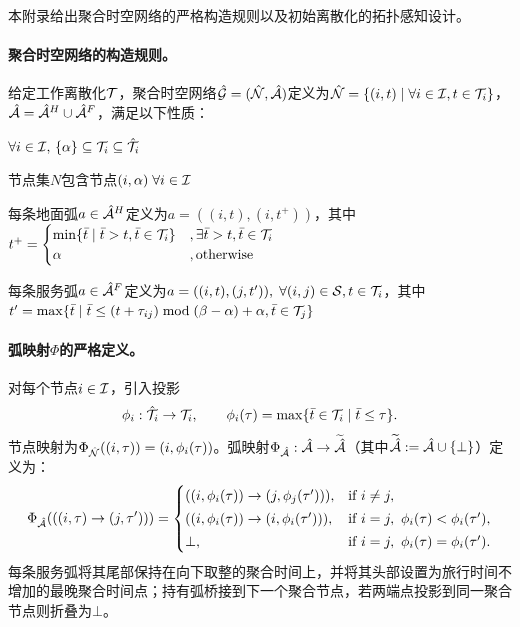 本附录给出聚合时空网络的严格构造规则以及初始离散化的拓扑感知设计。

\paragraph{聚合时空网络的构造规则。}
给定工作离散化$\mathcal{T}$，聚合时空网络$\hat{\mathcal{G}} = (\hat{\mathcal{N}}, \hat{\mathcal{A}})$定义为$\hat{\mathcal{N}} = \{(i,t)\mid \forall i\in\mathcal{I}, t\in\mathcal{T}_i\}$，$\hat{\mathcal{A}} = {\hat{\mathcal{A}}^H_{{}}} \cup {\hat{\mathcal{A}}^F_{{}}}$，满足以下性质：
\begin{property}
    $\forall i\in\mathcal{I},\,\{\alpha\}\subseteq\mathcal{T}_i\subseteq\hat{\mathcal{T}}_i$
\end{property}
\begin{property}[节点 $\nodeSet = \Phi_{\nodeSet}(\netFlat, \discretization)$]
    节点集$N$包含节点$(i,\alpha)\;\forall i\in\mathcal{I}$
\end{property}
\begin{property}[持有弧]
    \label{def:relax.holdingArc}
    每条地面弧$a\in{\hat{\mathcal{A}}^H_{{}}}$定义为$a=((i,t),(i,t^{+}))$，其中
    $t^{+}=\begin{cases}
            \min\{\bar{t}\mid\bar{t}>t,\bar{t}\in\mathcal{T}_i\} & ,\exists\bar{t}>t,\bar{t}\in\mathcal{T}_i\\
            \alpha & ,\text{otherwise}
    \end{cases}$
\end{property}
\begin{property}[服务弧]
    \label{def:relax.flightArc}
    每条服务弧$a\in{\hat{\mathcal{A}}^F_{{}}}$定义为$a=((i,t),(j,t^\prime)),\;\forall (i,j)\in\mathcal{S},t\in\mathcal{T}_i$，其中
    $t^\prime=\max\{\bar{t}\mid\bar{t}\leq(t+\tau_{ij})\;\text{mod}\;(\beta-\alpha)+\alpha,\bar{t}\in\mathcal{T}_j\}$
\end{property}

\paragraph{弧映射$\Phi$的严格定义。}
对每个节点$i\in\mathcal{I}$，引入投影
\[
    \phi_i:\hat{\mathcal{T}}_i\to\mathcal{T}_i,\qquad 
    \phi_i(\tau)=\max\{\bar{t}\in\mathcal{T}_i\mid \bar{t}\le \tau\}.
\]
节点映射为$\Phi_{\hat{\mathcal{N}}}((i,\tau))=(i,\phi_i(\tau))$。弧映射$\Phi_{\arcSet}:\full{\arcSet}\to\widetilde{\arcSet}$（其中$\widetilde{\hat{\mathcal{A}}}:=\hat{\mathcal{A}}\cup\{\bot\}$）定义为：
\begin{equation}
    \Phi_{\hat{\mathcal{A}}}(((i,\tau)\rightarrow(j,\tau'))) =
    \begin{cases}
        ((i,\phi_i(\tau))\rightarrow(j,\phi_j(\tau'))), & \text{if } i\neq j,\\[2pt]
        ((i,\phi_i(\tau))\rightarrow(i,\phi_i(\tau'))), & \text{if } i=j,\ \phi_i(\tau)<\phi_i(\tau'),\\[2pt]
        \bot, & \text{if } i=j,\ \phi_i(\tau)=\phi_i(\tau').
    \end{cases}
\end{equation}
每条服务弧将其尾部保持在向下取整的聚合时间上，并将其头部设置为旅行时间不增加的最晚聚合时间点；持有弧桥接到下一个聚合节点，若两端点投影到同一聚合节点则折叠为$\bot$。

